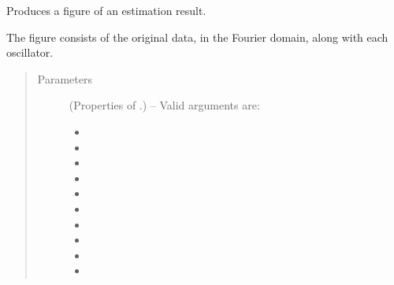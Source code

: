 \documentclass[letterpaper,10pt,english]{sphinxmanual}
\begin{document}
\begin{fulllineitems}
\begin{fulllineitems}
\end{fulllineitems}


\begin{fulllineitems}
\label{\detokenize{references/core:nmrespy.core.Estimator.plot_result}}
\sphinxAtStartPar
Produces a figure of an estimation result.

\sphinxAtStartPar
The figure consists of the original data, in the Fourier domain,
along with each oscillator.
\begin{quote}\begin{description}
\item[{Parameters}] \leavevmode
\sphinxAtStartPar
{} (Properties of {\hyperref[\detokenize{references/write:nmrespy.write.write_result}]{}}.) – 
\sphinxAtStartPar
Valid arguments are:
\begin{itemize}
\item {} 
\sphinxAtStartPar
{}

\item {} 
\sphinxAtStartPar
{}

\item {} 
\sphinxAtStartPar
{}

\item {} 
\sphinxAtStartPar
{}

\item {} 
\sphinxAtStartPar
{}

\item {} 
\sphinxAtStartPar
{}

\item {} 
\sphinxAtStartPar
{}

\item {} 
\sphinxAtStartPar
{}

\item {} 
\sphinxAtStartPar
{}

\item {} 
\sphinxAtStartPar
{}


\end{itemize}
\end{description}
\end{quote}
\end{fulllineitems}
\end{fulllineitems}
\end{document}
